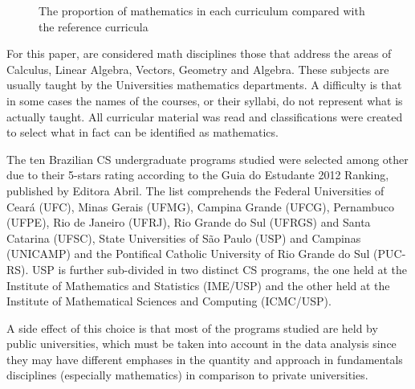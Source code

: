 \documentclass[conference]{IEEEtran}
\begin{document}
\begin{figure}[!t]
\centering
{}
\caption{The proportion of mathematics in each curriculum compared with the reference curricula}
\end{figure}

	For this paper, are considered math disciplines those that address the areas of Calculus, Linear Algebra, Vectors, Geometry and Algebra. These subjects are usually taught by the Universities mathematics departments. A difficulty is that in some cases the names of the courses, or their syllabi, do not represent what is actually taught. All curricular material was read and classifications were created to select what in fact can be identified as mathematics.

	The ten Brazilian CS undergraduate programs studied were selected among other due to their 5-stars rating according to the Guia do Estudante 2012 Ranking, published by Editora Abril. \cite{guia_estudante} The list comprehends the Federal Universities of Ceará (UFC), Minas Gerais (UFMG), Campina Grande (UFCG), Pernambuco (UFPE), Rio de Janeiro (UFRJ), Rio Grande do Sul (UFRGS) and Santa Catarina (UFSC), State Universities of São Paulo (USP) and Campinas (UNICAMP) and the Pontifical Catholic University of Rio Grande do Sul (PUC-RS). USP is further sub-divided in two distinct CS programs, the one held at the Institute of Mathematics and Statistics (IME/USP) and the other held at the Institute of Mathematical Sciences and Computing (ICMC/USP).
	
	A side effect of this choice is that most of the programs studied are held by public universities, which must be taken into account in the data analysis since they may have different emphases in the quantity and approach in fundamentals disciplines (especially mathematics) in comparison to private universities.
	
\end{document}
